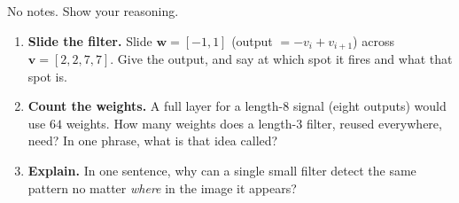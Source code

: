 \documentclass[10pt]{article}
\newcommand{\vv}{\mathbf{v}}
\newcommand{\ww}{\mathbf{w}}
\begin{document}
\namedateperiod

\vspace{0.15in}

No notes. Show your reasoning.

\begin{enumerate}[leftmargin=1.8em, itemsep=16pt]
  \item \textbf{Slide the filter.} Slide $\ww=[-1,1]$ (output $=-v_i+v_{i+1}$) across $\vv=[2,2,7,7]$.
        Give the output, and say at which spot it fires and what that spot is.
        \vspace{1.6cm}
  \item \textbf{Count the weights.} A full layer for a length-$8$ signal (eight outputs) would use $64$
        weights. How many weights does a length-$3$ filter, reused everywhere, need? In one phrase, what is
        that idea called?
        \vspace{1.1cm}
  \item \textbf{Explain.} In one sentence, why can a single small filter detect the same pattern no matter
        \emph{where} in the image it appears?
\end{enumerate}
\end{document}
